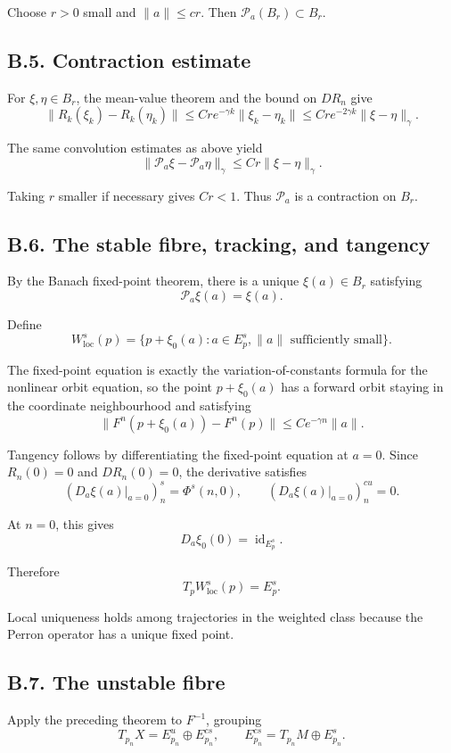\documentclass[12pt,a4paper]{article}
\theoremstyle{plain}
\numberwithin{equation}{section}
\numberwithin{theorem}{section}
\begin{document}
Choose $r>0$ small and $\|a\|\le c r$. Then $\mathcal P_a(B_r)\subset B_r$.

\subsection{B.5. Contraction estimate}

For $\xi,\eta\in B_r$, the mean-value theorem and the bound on $DR_n$ give
\[
\|R_k(\xi_k)-R_k(\eta_k)\|
\le
C r e^{-\gamma k}\|\xi_k-\eta_k\|
\le
C r e^{-2\gamma k}\|\xi-\eta\|_\gamma.
\]

The same convolution estimates as above yield
\[
\|\mathcal P_a\xi-\mathcal P_a\eta\|_\gamma
\le
C r\|\xi-\eta\|_\gamma.
\]

Taking $r$ smaller if necessary gives $Cr<1$. Thus $\mathcal P_a$ is a contraction on $B_r$.

\subsection{B.6. The stable fibre, tracking, and tangency}

By the Banach fixed-point theorem, there is a unique $\xi(a)\in B_r$ satisfying
\[
\mathcal P_a\xi(a)=\xi(a).
\]

Define
\[
W^s_{\mathrm{loc}}(p)=
\{p+\xi_0(a):a\in E^s_p,
\|a\|\text{ sufficiently small}\}.
\]

The fixed-point equation is exactly the variation-of-constants formula for the nonlinear orbit equation, so the point $p+\xi_0(a)$ has a forward orbit staying in the coordinate neighbourhood and satisfying
\[
\|F^n(p+\xi_0(a))-F^n(p)\|
\le
C e^{-\gamma n}\|a\|.
\]

Tangency follows by differentiating the fixed-point equation at $a=0$. Since $R_n(0)=0$ and $DR_n(0)=0$, the derivative satisfies
\[
(D_a\xi(a)|_{a=0})_n^s=
\Phi^s(n,0),
\qquad
(D_a\xi(a)|_{a=0})_n^{cu}=0.
\]

At $n=0$, this gives
\[
D_a\xi_0(0)=\operatorname{id}_{E^s_p}.
\]

Therefore
\[
T_pW^s_{\mathrm{loc}}(p)=E^s_p.
\]

Local uniqueness holds among trajectories in the weighted class because the Perron operator has a unique fixed point.

\subsection{B.7. The unstable fibre}

Apply the preceding theorem to $F^{-1}$, grouping
\[
T_{p_n}X=E^u_{p_n}\oplus E^{cs}_{p_n},
\qquad
E^{cs}_{p_n}=T_{p_n}M\oplus E^s_{p_n}.
\]
\end{document}
